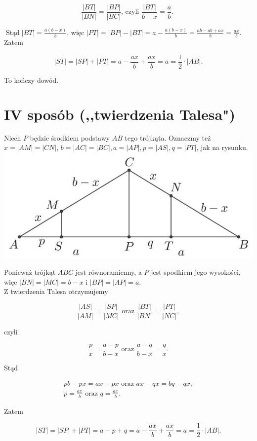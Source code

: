 \documentclass[10pt]{article}
\begin{document}
$$
\frac{|B T|}{|B N|}=\frac{|B P|}{|B C|} \text {, czyli } \frac{|B T|}{b-x}=\frac{a}{b} \text {. }
$$

$\operatorname{Stąd}|B T|=\frac{a(b-x)}{b}$, więc $|P T|=|B P|-|B T|=a-\frac{a(b-x)}{b}=\frac{a b-a b+a x}{b}=\frac{a x}{b}$.\\
Zatem

$$
|S T|=|S P|+|P T|=a-\frac{a x}{b}+\frac{a x}{b}=a=\frac{1}{2} \cdot|A B| .
$$

To kończy dowód.

\section*{IV sposób (,,twierdzenia Talesa")}
Niech $P$ będzie środkiem podstawy $A B$ tego trójkąta. Oznaczmy też $x=|A M|=|C N|$, $b=|A C|=|B C|, a=|A P|, p=|A S|, q=|P T|$, jak na rysunku.\\
\includegraphics[max width=\textwidth, center]{2025_02_07_d712b9a47aa2c64928dbg-18}

Ponieważ trójkąt $A B C$ jest równoramienny, a $P$ jest spodkiem jego wysokości, więc $|B N|=|M C|=b-x$ i $|B P|=|A P|=a$.\\
Z twierdzenia Talesa otrzymujemy

$$
\frac{|A S|}{|A M|}=\frac{|S P|}{|M C|} \text { oraz } \frac{|B T|}{|B N|}=\frac{|P T|}{|N C|},
$$

czyli

$$
\frac{p}{x}=\frac{a-p}{b-x} \text { oraz } \frac{a-q}{b-x}=\frac{q}{x} .
$$

Stąd

$$
\begin{gathered}
p b-p x=a x-p x \text { oraz } a x-q x=b q-q x, \\
p=\frac{a x}{b} \text { oraz } q=\frac{a x}{b} .
\end{gathered}
$$

Zatem

$$
|S T|=|S P|+|P T|=a-p+q=a-\frac{a x}{b}+\frac{a x}{b}=a=\frac{1}{2} \cdot|A B| .
$$
\end{document}
